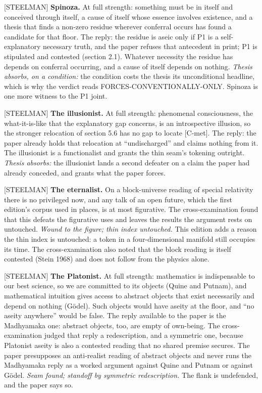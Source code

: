 \documentclass[11pt]{article}
\newcommand{\register}[1]{{\ttfamily\small #1}}
\begin{document}
\register{[STEELMAN]} \textbf{Spinoza.} At full strength: something must be in itself and conceived through itself, a cause of itself whose essence involves existence, and a thesis that finds a non-zero residue wherever conferral occurs has found a candidate for that floor. The reply: the residue is aseic only if P1 is a self-explanatory necessary truth, and the paper refuses that antecedent in print; P1 is stipulated and contested (section 2.1). Whatever necessity the residue has depends on conferral occurring, and a cause of itself depends on nothing. \emph{Thesis absorbs, on a condition:} the condition costs the thesis its unconditional headline, which is why the verdict reads FORCES-CONVENTIONALLY-ONLY. Spinoza is one more witness to the P1 joint.

\register{[STEELMAN]} \textbf{The illusionist.} At full strength: phenomenal consciousness, the what-it-is-like that the explanatory gap concerns, is an introspective illusion, so the stronger relocation of section 5.6 has no gap to locate [C-met]. The reply: the paper already holds that relocation at ``undischarged'' and claims nothing from it. The illusionist is a functionalist and grants the thin seam's tokening outright. \emph{Thesis absorbs:} the illusionist lands a second defeater on a claim the paper had already conceded, and grants what the paper forces.

\register{[STEELMAN]} \textbf{The eternalist.} On a block-universe reading of special relativity there is no privileged now, and any talk of an open future, which the first edition's corpus used in places, is at most figurative. The cross-examination found that this defeats the figurative uses and leaves the results the argument rests on untouched. \emph{Wound to the figure; thin index untouched.} This edition adds a reason the thin index is untouched: a token in a four-dimensional manifold still occupies its time. The cross-examination also noted that the block reading is itself contested (Stein 1968) and does not follow from the physics alone.

\register{[STEELMAN]} \textbf{The Platonist.} At full strength: mathematics is indispensable to our best science, so we are committed to its objects (Quine and Putnam), and mathematical intuition gives access to abstract objects that exist necessarily and depend on nothing (Gödel). Such objects would have aseity at the floor, and ``no aseity anywhere'' would be false. The reply available to the paper is the Madhyamaka one: abstract objects, too, are empty of own-being. The cross-examination judged that reply a redescription, and a symmetric one, because Platonist aseity is also a contested reading that no shared premise secures. The paper presupposes an anti-realist reading of abstract objects and never runs the Madhyamaka reply as a worked argument against Quine and Putnam or against Gödel. \emph{Seam found; standoff by symmetric redescription.} The flank is undefended, and the paper says so.
\end{document}

